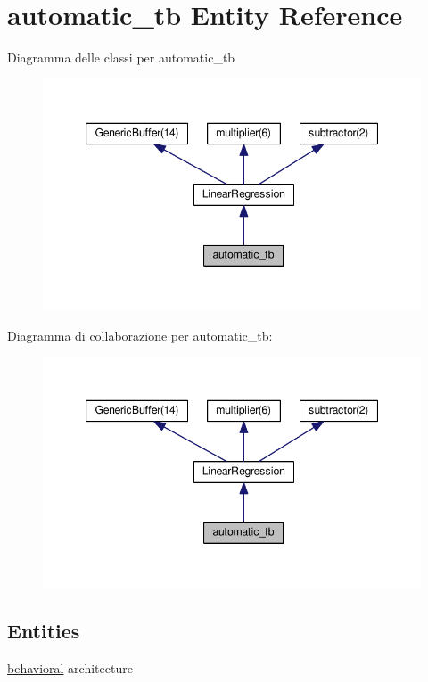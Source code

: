 \hypertarget{classautomatic__tb}{\section{automatic\+\_\+tb Entity Reference}
\label{classautomatic__tb}
}


Diagramma delle classi per automatic\+\_\+tb\nopagebreak
\begin{figure}[H]
\begin{center}
\leavevmode
\includegraphics[width=347pt]{classautomatic__tb__inherit__graph}
\end{center}
\end{figure}


Diagramma di collaborazione per automatic\+\_\+tb\+:\nopagebreak
\begin{figure}[H]
\begin{center}
\leavevmode
\includegraphics[width=347pt]{classautomatic__tb__coll__graph}
\end{center}
\end{figure}
\subsection*{Entities}
\begin{DoxyCompactItemize}
\item 
\hyperlink{classautomatic__tb_1_1behavioral}{behavioral} architecture
\end{DoxyCompactItemize}
